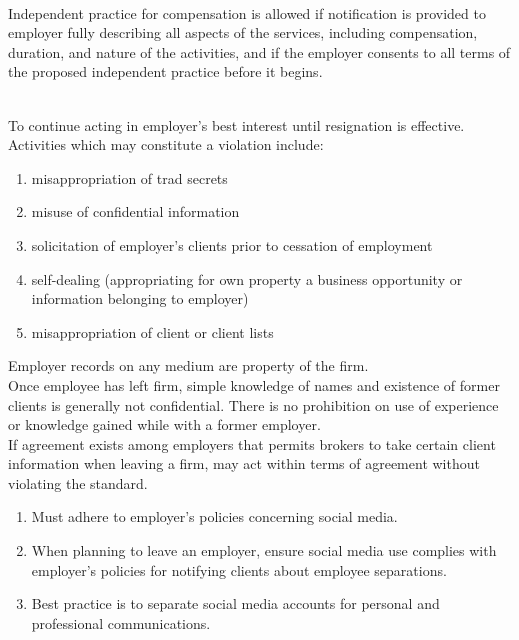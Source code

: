 \begin{remark} \\
Independent practice for compensation is allowed if notification is provided to employer fully describing all aspects of the services, including compensation, duration, and nature of the activities, and if the employer consents to all terms of the proposed independent practice before it begins.
\end{remark}

\begin{remark} \\
To continue acting in employer's best interest until resignation is effective.\\
Activities which may constitute a violation include:
\begin{enumerate}[label=\roman*.]
\setlength{\itemsep}{0pt}
\item misappropriation of trad secrets
\item misuse of confidential information
\item solicitation of employer's clients prior to cessation of employment
\item self-dealing (appropriating for own property a business opportunity or information belonging to employer)
\item misappropriation of client or client lists
\end{enumerate}
Employer records on any medium are property of the firm.\\
Once employee has left firm, simple knowledge of names and existence of former clients is generally not confidential. There is no prohibition on use of experience or knowledge gained while with a former employer.\\
If agreement exists among employers that permits brokers to take certain client information when leaving a firm, may act within terms of agreement without violating the standard.
\end{remark}

\begin{remark} 
\begin{enumerate}[label=\roman*.]
\setlength{\itemsep}{0pt}
\item Must adhere to employer's policies concerning social media.
\item When planning to leave an employer, ensure social media use complies with employer's policies for notifying clients about employee separations.
\item Best practice is to separate social media accounts for personal and professional communications.
\end{enumerate}
\end{remark}

